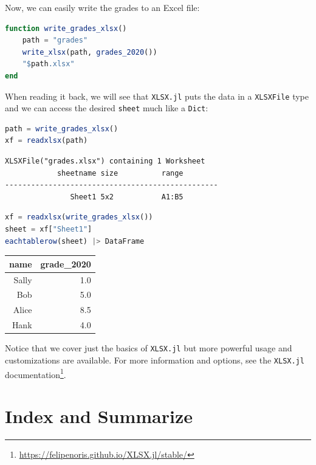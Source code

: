 \documentclass[
  notoc %
]{tufte-book}
\DeclareRobustCommand{\href}[2]{#2\footnote{\url{#1}}}
\newcommand{\passthrough}[1]{#1}
\begin{document}
Now, we can easily write the grades to an Excel file:

\begin{lstlisting}[language=Julia]
function write_grades_xlsx()
    path = "grades"
    write_xlsx(path, grades_2020())
    "$path.xlsx"
end
\end{lstlisting}

When reading it back, we will see that \passthrough{\lstinline!XLSX.jl!}
puts the data in a \passthrough{\lstinline!XLSXFile!} type and we can
access the desired \passthrough{\lstinline!sheet!} much like a
\passthrough{\lstinline!Dict!}:

\begin{lstlisting}[language=Julia]
path = write_grades_xlsx()
xf = readxlsx(path)
\end{lstlisting}

\begin{lstlisting}[language=Output]
XLSXFile("grades.xlsx") containing 1 Worksheet
            sheetname size          range        
-------------------------------------------------
               Sheet1 5x2           A1:B5        

\end{lstlisting}

\begin{lstlisting}[language=Julia]
xf = readxlsx(write_grades_xlsx())
sheet = xf["Sheet1"]
eachtablerow(sheet) |> DataFrame
\end{lstlisting}

\begin{longtable}[]{@{}rr@{}}
\toprule
name & grade\_2020 \\
\midrule
\endhead
Sally & 1.0 \\
Bob & 5.0 \\
Alice & 8.5 \\
Hank & 4.0 \\
\bottomrule
\end{longtable}

Notice that we cover just the basics of
\passthrough{\lstinline!XLSX.jl!} but more powerful usage and
customizations are available. For more information and options, see the
\href{https://felipenoris.github.io/XLSX.jl/stable/}{\passthrough{\lstinline!XLSX.jl!}
documentation}.

\hypertarget{index-and-summarize}{%
\section{Index and Summarize}\label{index-and-summarize}}
\end{document}
